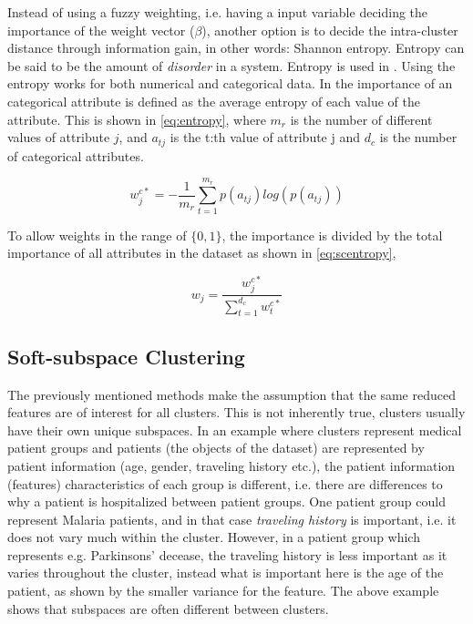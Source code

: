\documentclass[../report.tex]{subfiles}
\begin{document}
Instead of using a fuzzy weighting, i.e. having a input variable deciding the importance of the weight vector ($\beta$), another option is to decide the intra-cluster distance through information gain, in other words: Shannon entropy. Entropy can be said to be the amount of \textit{disorder} in a system. Entropy is used in \cite{Cheung2013, Jing2007}. Using the entropy works for both numerical and categorical data. In \cite{Cheung2013} the importance of an categorical attribute is defined as the average entropy of each value of the attribute. This is shown in \cref{eq:entropy}, where ${m_r}$ is the number of different values of attribute $j$, and $a_{tj}$ is the t:th value of attribute j and $d_c$ is the number of categorical attributes.

\begin{equation}
  w_j^{c*} =  - \frac{1}{m_r} \sum^{m_r}_{t = 1}{p(a_{tj}) log(p(a_{tj}))}
\label{eq:entropy}
\end{equation}

To allow weights in the range of $\{0,1\}$, the importance is divided by the total importance of all attributes in the dataset as shown in \cref{eq:scentropy}, 


\begin{equation}
  w_j = \frac{w_j^{c*}}{\sum_{t = 1}^{d_c}{w_t^{c*}}}
  \label{eq:scentropy}
\end{equation}

\subsection{Soft-subspace Clustering}
  The previously mentioned methods make the assumption that the same reduced features are of interest for all clusters. This is not inherently true, clusters usually have their own unique subspaces. In an example where clusters represent medical patient groups and patients (the objects of the dataset) are represented by patient information (age, gender, traveling history etc.), the patient information (features) characteristics of each group is different, i.e. there are differences to why a patient is hospitalized between patient groups. One patient group could represent Malaria patients, and in that case \textit{traveling history} is important, i.e. it does not vary much within the cluster. However, in a patient group which represents e.g. Parkinsons' decease, the traveling history is less important as it varies throughout the cluster, instead what is important here is the age of the patient, as shown by the smaller variance for the feature. The above example shows that subspaces are often different between clusters.
\end{document}
